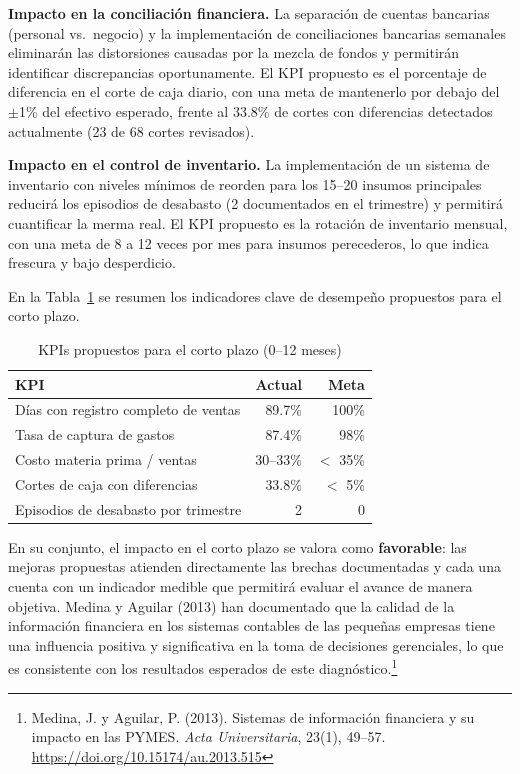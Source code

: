 \documentclass[12pt,letterpaper]{article}
\begin{document}
\textbf{Impacto en la conciliación financiera.} La separación de cuentas bancarias (personal vs.\ negocio) y la implementación de conciliaciones bancarias semanales eliminarán las distorsiones causadas por la mezcla de fondos y permitirán identificar discrepancias oportunamente. El KPI propuesto es el porcentaje de diferencia en el corte de caja diario, con una meta de mantenerlo por debajo del $\pm$1\% del efectivo esperado, frente al 33.8\% de cortes con diferencias detectados actualmente (23 de 68 cortes revisados).

\textbf{Impacto en el control de inventario.} La implementación de un sistema de inventario con niveles mínimos de reorden para los 15--20 insumos principales reducirá los episodios de desabasto (2 documentados en el trimestre) y permitirá cuantificar la merma real. El KPI propuesto es la rotación de inventario mensual, con una meta de 8 a 12 veces por mes para insumos perecederos, lo que indica frescura y bajo desperdicio.

En la Tabla~\ref{tab:kpis_corto} se resumen los indicadores clave de desempeño propuestos para el corto plazo.

\begin{table}[ht]
\centering
\caption{KPIs propuestos para el corto plazo (0--12 meses)}
\label{tab:kpis_corto}
\begin{tabular}{l r r}
\toprule
\textbf{KPI} & \textbf{Actual} & \textbf{Meta} \\
\midrule
Días con registro completo de ventas & 89.7\% & 100\% \\
Tasa de captura de gastos & 87.4\% & 98\% \\
Costo materia prima / ventas & 30--33\% & $<$ 35\% \\
Cortes de caja con diferencias & 33.8\% & $<$ 5\% \\
Episodios de desabasto por trimestre & 2 & 0 \\
\bottomrule
\end{tabular}
\end{table}

En su conjunto, el impacto en el corto plazo se valora como \textbf{favorable}: las mejoras propuestas atienden directamente las brechas documentadas y cada una cuenta con un indicador medible que permitirá evaluar el avance de manera objetiva. Medina y Aguilar (2013) han documentado que la calidad de la información financiera en los sistemas contables de las pequeñas empresas tiene una influencia positiva y significativa en la toma de decisiones gerenciales, lo que es consistente con los resultados esperados de este diagnóstico.\footnote{Medina, J. y Aguilar, P. (2013). Sistemas de información financiera y su impacto en las PYMES. \textit{Acta Universitaria}, 23(1), 49--57. \url{https://doi.org/10.15174/au.2013.515}}
\end{document}
